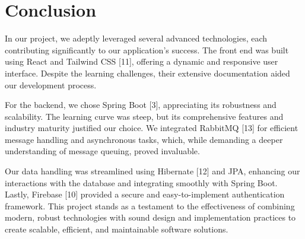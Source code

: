 \section{Conclusion}
\label{sec:conclusion}


In our project, we adeptly leveraged several advanced technologies, each contributing significantly to our application's success. The front end was built using React and Tailwind CSS [11], offering a dynamic and responsive user interface. Despite the learning challenges, their extensive documentation aided our development process.

For the backend, we chose Spring Boot [3], appreciating its robustness and scalability. The learning curve was steep, but its comprehensive features and industry maturity justified our choice. We integrated RabbitMQ [13] for efficient message handling and asynchronous tasks, which, while demanding a deeper understanding of message queuing, proved invaluable.

Our data handling was streamlined using Hibernate [12] and JPA, enhancing our interactions with the database and integrating smoothly with Spring Boot. Lastly, Firebase [10] provided a secure and easy-to-implement authentication framework. This project stands as a testament to the effectiveness of combining modern, robust technologies with sound design and implementation practices to create scalable, efficient, and maintainable software solutions.